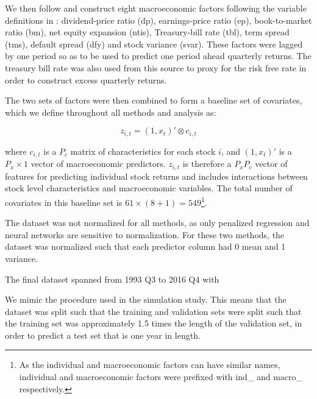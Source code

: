 \documentclass[a4paper, table]{article}
\begin{document}
We then follow \cite{gu_empirical_2018} and construct eight macroeconomic factors following the variable definitions in \cite{welch_comprehensive_2008}: dividend-price ratio (dp), earnings-price ratio (ep), book-to-market ratio (bm), net equity expansion (ntis), Treasury-bill rate (tbl), term spread (tms), default spread (dfy) and stock variance (svar). These factors were lagged by one period so as to be used to predict one period ahead quarterly returns. The treasury bill rate was also used from this source to proxy for the risk free rate in order to construct excess quarterly returns. 

The two sets of factors were then combined to form a baseline set of covariates, which we define throughout all methods and analysis as:

\begin{equation}
z_{i,t} = (1, x_t)' \otimes c_{i, t}
\end{equation}

where $c_{i,t}$ is a $P_c$ matrix of characteristics for each stock $i$, and $(1, x_t)'$ is a $P_x \times 1$ vector of macroeconomic predictors. $z_{i,t}$ is therefore a $P_x P_c$ vector of features for predicting individual stock returns and includes interactions between stock level characteristics and macroeconomic variables. The total number of covariates in this baseline set is $61 \times (8 + 1) = 549$\footnote{As the individual and macroeconomic factors can have similar names, individual and macroeconomic factors were prefixed with ind\_ and macro\_ respectively.}.
 

The dataset was not normalized for all methods, as only penalized regression and neural networks are sensitive to normalization. For these two methods, the dataset was normalized such that each predictor column had 0 mean and 1 variance.

The final dataset spanned from 1993 Q3 to 2016 Q4 with 

We mimic the procedure used in the simulation study. This means that the dataset was split such that the training and validation sets were split such that the training set was approximately 1.5 times the length of the validation set, in order to predict a test set that is one year in length.
\end{document}
